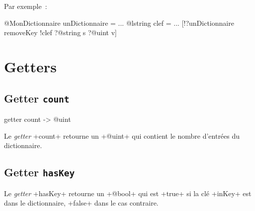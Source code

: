 Par exemple~:
\begin{galgas}
@MonDictionnaire unDictionnaire = {}
...
@lstring clef = ...
[!?unDictionnaire removeKey !clef ?@string s ?@uint v]
\end{galgas}

\section{Getters}

%
%

\subsection{Getter \texttt{count}}

\begin{galgas}
getter count -> @uint
\end{galgas}


Le \emph{getter} \ggs+count+ retourne un \ggs+@uint+ qui contient le nombre d'entrées du dictionnaire.



\subsection{Getter \texttt{hasKey}}


Le \emph{getter} \ggs+hasKey+ retourne un \ggs+@bool+ qui est \ggs+true+ si la clé \ggs+inKey+ est dans le dictionnaire, \ggs+false+ dans le cas contraire.



%
%
%



